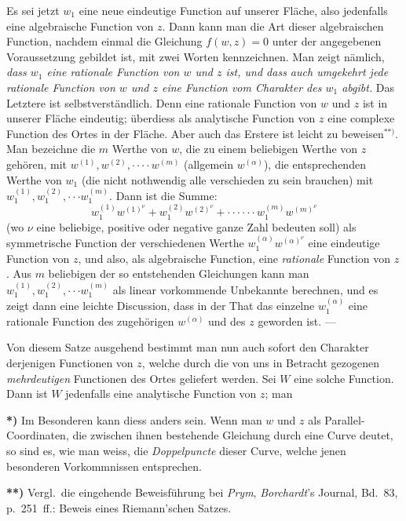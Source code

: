 \documentclass{article}
\begin{document}
Es sei jetzt $w_{1}$ eine neue eindeutige Function auf unserer Fläche, also jedenfalls eine algebraische Function von $z$. Dann kann man die Art dieser algebraischen Function, nachdem einmal die Gleichung $f(w, z) = 0$ unter der angegebenen Voraussetzung gebildet ist, mit zwei Worten kennzeichnen. Man zeigt nämlich, \emph{dass $w_{1}$ eine rationale Function von $w$ und $z$ ist, und dass auch umgekehrt jede rationale Function von $w$ und $z$ eine Function vom Charakter des $w_{1}$ abgibt.} Das Letztere ist selbstverständlich. Denn eine rationale Function von $w$ und $z$ ist in unserer Fläche eindeutig; überdiess als analytische Function von $z$ eine complexe Function des Ortes in der Fläche. Aber auch das Erstere ist leicht zu beweisen${}^{**)}$. Man bezeichne die $m$ Werthe von $w$, die zu einem beliebigen Werthe von $z$ gehören, mit $w^{(1)}, w^{(2)}, \cdot\cdot\cdot\cdot w^{(m)}$ (allgemein $w^{(\alpha)}$), die entsprechenden Werthe von $w_{1}$ (die nicht nothwendig alle verschieden zu sein brauchen) mit $w_{1}^{(1)}, w_{1}^{(2)}, \cdot\cdot\cdot w_{1}^{(m)}$. Dann ist die Summe:
\[ w_{1}^{(1)} w^{(1)^{\nu}} + w_{1}^{(2)} w^{(2)^{\nu}} + \cdot\cdot\cdot\cdot\cdot\cdot w_{1}^{(m)} w^{(m)^{\nu}} \]
(wo $\nu$ eine beliebige, positive oder negative ganze Zahl bedeuten soll) als symmetrische Function der verschiedenen Werthe $w_{1}^{(\alpha)} w^{(\alpha)^{\nu}}$ eine eindeutige Function von $z$, und also, als algebraische Function, eine \emph{rationale} Function von $z$. Aus $m$ beliebigen der so entstehenden Gleichungen kann man $w_{1}^{(1)}, w_{1}^{(2)}, \cdot\cdot\cdot w_{1}^{(m)}$ als linear vorkommende Unbekannte berechnen, und es zeigt dann eine leichte Discussion, dass in der That das einzelne $w_{1}^{(\alpha)}$ eine rationale Function des zugehörigen $w^{(\alpha)}$ und des $z$ geworden ist. ---

Von diesem Satze ausgehend bestimmt man nun auch sofort den Charakter derjenigen Functionen von $z$, welche durch die von uns in Betracht gezogenen \emph{mehrdeutigen} Functionen des Ortes geliefert werden. Sei $W$ eine solche Function. Dann ist $W$ jedenfalls eine analytische Function von $z$; man

\textbf{*)} Im Besonderen kann diess anders sein. Wenn man $w$ und $z$ als Parallel-Coordinaten, die zwischen ihnen bestehende Gleichung durch eine Curve deutet, so sind es, wie man weiss, die \emph{Doppelpuncte} dieser Curve, welche jenen besonderen Vorkommnissen entsprechen.

\textbf{**)} Vergl.\ die eingehende Beweisführung bei \emph{Prym}, \emph{Borchardt}'s Journal, Bd.~83, p.~251~ff.: Beweis eines Riemann'schen Satzes.
\end{document}
